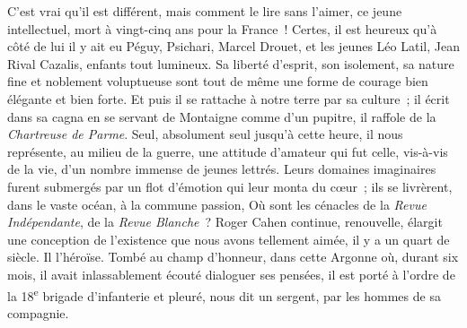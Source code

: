 \documentclass[french,twoside]{book} %
\begin{document}
\noindent C’est vrai qu’il est différent, mais comment le lire sans l’aimer, ce jeune intellectuel, mort à vingt-cinq ans pour la France ! Certes, il est heureux qu’à côté de lui il y ait eu Péguy, Psichari, Marcel Drouet, et les jeunes Léo Latil, Jean Rival Cazalis, enfants tout lumineux. Sa liberté d’esprit, son isolement, sa nature fine et noblement voluptueuse sont tout de même une forme de courage bien élégante et bien forte. Et puis il se rattache à notre terre par sa culture ; il écrit dans sa cagna en se servant de Montaigne comme d’un pupitre, il raffole de la {\itshape Chartreuse de Parme}. Seul, absolument seul jusqu’à cette heure, il nous représente, au milieu de la guerre, une attitude d’amateur qui fut celle, vis-à-vis de la vie, d’un nombre immense de jeunes lettrés. Leurs domaines imaginaires furent submergés par un flot d’émotion qui leur monta du cœur ; ils se livrèrent, dans le vaste océan, à la commune passion, Où sont les cénacles de la {\itshape Revue Indépendante}, de la {\itshape Revue Blanche} ? Roger Cahen continue, renouvelle, élargit une conception de l’existence que nous avons tellement aimée, il y a un quart de siècle. Il l’héroïse. Tombé au champ d’honneur, dans cette Argonne où, durant six mois, il avait inlassablement écouté dialoguer ses pensées, il est porté à l’ordre de la 18\textsuperscript{e} brigade d’infanterie et pleuré, nous dit un sergent, par les hommes de sa compagnie.‌\par
\par
\end{document}
